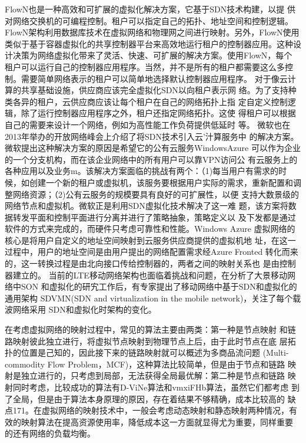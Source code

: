 FlowN也是一种高效和可扩展的虚拟化解决方案，它基于SDN技术构建，以提 供对网络交换机的可编程控制。租户可以指定自己的拓扑、地址空间和控制逻辑。 FlowN架构利用数据库技术在虚拟网络和物理网之间进行映射。另外，FlowN使用 类似于基于容器虚拟化的共享控制器平台来高效地运行租户的控制器应用。这种设计决策为网络虚拟化带来了灵活、快速、可扩展的解决方案。使用FlowN，每个 租户可以运行自己的控制器应用程序。当然，并不是所有的租户都需要这么多控 制。需要简单网络表示的租户可以简单地选择默认控制器应用程序。
对于像云计算的共享基础设施，供应商应该完全虚拟化SDN以向租户表示网 络。为了支持种类各异的租户，云供应商应该让每个租户在自己的网络拓扑上指 定自定义控制逻辑，除了运行控制器应用程序之外，租户还指定网络拓扑。这使 得租户可以根据自己的需要来设计一个网络，例如为高性能工作负荷提供低延时 等。
微软也在2013年举办的开放网络峰会上介绍了将SDN技术引入云'汁算服务中 的解决方案。微软提出这种解决方案的原因是希望它的公有云服务WindowsAzure 可以作为企业的一个分支机构，而在该企业网络中的所有用户可以靠VPN访问公 有云服务上的各种应用以及业务m。该解决方案面临的挑战有两个：（1)每当用户有需求的时候，如创建一个新的租户或虚拟机，该服务要根据用户实际的需求，重新配置和调整网络资源；（2)公有云服务的规模要具有良好的可扩展性，以便 支持大数景级的网络节点和虚拟机。微软正是利用SDN虚拟化技术解决了这一难 题，该方案将数据转发平面和控制平面进行分离并进行了策略抽象，策略定义以 及下发都是通过软件的方式来完成的，而硬件只考虑可靠性和性能。Windows Azure 虚拟网络的核心是将用户自定义的地址空间映射到云服务供应商提供的虚拟机地 址，在这一过程中，用户的地址空间是由用户提出的网络配置需求经Azure Fronted 转化而来的，这一转换过程是由北向接口传给控制器的，两者之间的映射关系也 是由控制器建立的。
当前的LTE移动网络架构也面临着挑战和问题，在分析了大景移动网络中SON 和虚拟化的研宄工作后，有专家提出了移动网络中基于SDN和虚拟化的通用架构 SDVMN(SDN and virtualization in the mobile network)，关注了每个载波网络采用 SDN和虚拟化时架构的变化。

在考虑虚拟网络的映射过程中，常见的算法主要由两类：第一种是节点映射 和链路映射彼此独立进行，将虚拟节点映射到物理节点上后，由于此时节点在底 层拓扑的位置是己知的，因此接下来的链路映射就可以概述为多商品流问题 (Multi-commodity Flow Problem，MCF)，这种算法比较简单，但是由于节点和链路 映射是独立进行的，只考虑到局部，无法获得全局最优解：第二种是节点和链路 映射同时考虑，比较成功的算法有D-ViNe算法和vmxiFHb算法，虽然它们都考虑 到了全局，但是由于算法本身原理的原因，存在着结果不够精确，成本比较高的 缺点171。在虚拟网络的映射技术中，一般会考虑动态映射和静态映射两种情况，有 效的映射算法在提高资源使用率，降低成本这一方面就显得尤为重要，同样重要 的还有网络的负载均衡。
